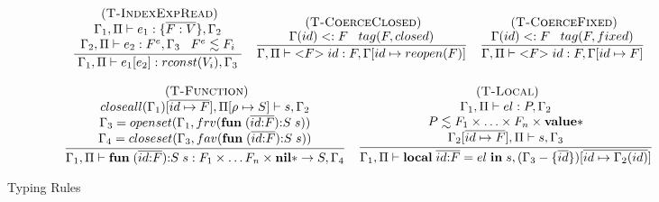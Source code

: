 \documentclass[10pt]{sigplanconf}
\newcommand{\Value}{\mathbf{value}}
\newcommand{\Nil}{\mathbf{nil}}
\newcommand{\Void}{\Nil{*}}
\newcommand{\mylabel}[1]{\; (\textsc{#1})}
\newcommand{\env}{\Gamma}
\newcommand{\penv}{\Pi}
\newcommand{\subtype}{<:}
\newcommand{\ret}{\rho}
\begin{document}
\begin{figure*}[t]
{\[\begin{array}{c}
\begin{array}{c}
\mylabel{T-IndexExpRead}\\
\dfrac{\begin{array}{c}
	\env_{1}, \penv \vdash e_{1}:\{\overline{F:V}\}, \env_{2}\\
	\env_{2}, \penv \vdash e_{2}:F^e, \env_{3} \;\;\;
	 F^e \lesssim F_{i}
	\end{array}}
{\env_{1}, \penv \vdash e_{1}[e_{2}]:rconst(V_{i}), \env_{3}}
\end{array}
\begin{array}{c}
\mylabel{T-CoerceClosed}\\
\dfrac{\env(id) \subtype F \;\;\; tag(F,closed)}
{\env, \penv \vdash {<}F{>} \; id:F, \env[id \mapsto reopen(F)]}
\end{array}
\begin{array}{c}
\mylabel{T-CoerceFixed}\\
\dfrac{\env(id) \subtype F \;\;\; tag(F,fixed)}
{\env, \penv \vdash {<}F{>} \; id:F, \env[id \mapsto F]}
\end{array}\\\\
\begin{array}{c}
\mylabel{T-Function}\\
\dfrac{\begin{array}{c}
	closeall(\env_{1})[\overline{id \mapsto F}], \penv[\ret \mapsto S] \vdash s, \env_{2}\\
	\env_{3} = openset(\env_{1}, frv(\mathbf{fun} \; (\overline{id{:}F}){:}S \; s)) \\
	\env_{4} = closeset(\env_{3}, fav(\mathbf{fun} \; (\overline{id{:}F}){:}S \; s))
	\end{array}}
{\env_{1}, \penv \vdash \mathbf{fun} \; (\overline{id{:}F}){:}S \; s:F_1 \times \ldots F_n \times \Void \rightarrow S, \env_{4}}
\end{array}
\begin{array}{c}
\mylabel{T-Local}\\
\dfrac{\begin{array}{c}
	\env_{1}, \penv \vdash el:P, \env_{2} \\
	P \lesssim F_1 \times \ldots \times F_n \times \Value{*} \\
	\env_{2}[\overline{id \mapsto F}], \penv \vdash s, \env_{3}
	\end{array}}
{\env_{1}, \penv \vdash \mathbf{local} \; \overline{id{:}F} = el \; \mathbf{in} \; s, (\env_{3} - \{\overline{id}\})[\overline{id \mapsto \env_2(id)}]}
\end{array}
\end{array}
\]
}
\caption{Typing Rules}
\label{fig:tablerules}
\end{figure*}
\end{document}

